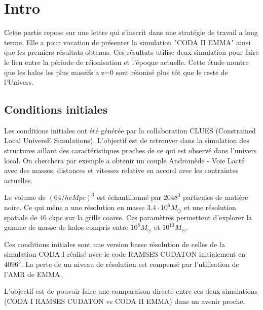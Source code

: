 \section{Intro}


Cette partie repose sur une lettre qui s'inscrit dans une stratégie de travail a long terme.
Elle a pour vocation de présenter la simulation "CODA II EMMA" ainsi que les premiers résultats obtenus.
Ces résultats utilise deux simulation pour faire le lien entre la période de réionisation et l’époque actuelle.
Cette étude montre que les halos les plus massifs a z=0 sont réionisé plus tôt que le reste de l'Univers.



\subsection{Conditions initiales}

Les conditions initiales ont été générée par la collaboration CLUES (Constrained Local UniversE Simulations).
L'objectif est de retrouver dans la simulation des structures aillant des caractéristiques proches de ce qui est observé dans l'univers local.
On cherchera par exemple a obtenir un couple Andromède - Voie Lacté avec des masses, distances et vitesses relative en accord avec les contraintes actuelles.


Le volume de $\left( 64/h cMpc \right) ^3$ est échantillonné par $2048^3$ particules de matière noire.
Ce qui mêne a une résolution en masse $3.4 \cdot 10^6 M_\odot$ et une résolution spatiale de 46 ckpc sur la grille coarse.
Ces paramètres permettent d'explorer la gamme de masse de halos compris entre $10^8 M_\odot$ et  $10^{13}M_\odot$.

Ces conditions initiales sont une version basse résolution de celles de la simulation CODA I%
réalisé avec le code RAMSES CUDATON %
initialement en $4096^3$.
La perte de un niveau de résolution est compensé par l'utilisation de l'AMR de EMMA.

L'objectif est de pouvoir faire une comparaison directe entre ces deux simulations (CODA I RAMSES CUDATON vs CODA II EMMA) dans un avenir proche.

